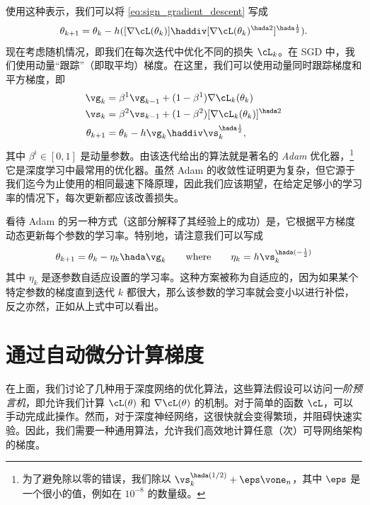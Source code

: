 \documentclass[../../book-main_zh.tex]{subfiles}
\begin{document}
使用这种表示，我们可以将 \eqref{eq:sign_gradient_descent} 写成
\begin{equation}
    \theta_{k + 1} = \theta_{k} - h ([\nabla \cL(\theta_{k})] \haddiv [\nabla
    \cL(\theta_{k})^{\hada 2}]^{\hada \frac{1}{2}}).
\end{equation}
现在考虑随机情况，即我们在每次迭代中优化不同的损失 \(\cL_{k}\)。在 SGD 中，我们使用动量“跟踪”（即取平均）梯度。在这里，我们可以使用动量同时跟踪梯度和平方梯度，即
\begin{align}
    \vg_{k}
    &= \beta^{1}\vg_{k - 1} + (1 - \beta^{1})\nabla \cL_{k}(\theta_{k}) \\
    \vs_{k}
    &= \beta^{2}\vs_{k - 1} + (1 - \beta^{2})[\nabla
    \cL_{k}(\theta_{k})]^{\hada 2}  \\
    \theta_{k + 1}
    &= \theta_{k} - h\vg_{k}\haddiv\vs_{k}^{\hada \frac{1}{2}},
\end{align}
其中 \(\beta^{i} \in [0, 1]\) 是动量参数。由该迭代给出的算法就是著名的 \textit{Adam} 优化器，\footnote{为了避免除以零的错误，我们除以 \(\vs_{k}^{\hada (1/2)} + \eps \vone_{n}\)，其中 \(\eps\) 是一个很小的值，例如在 \(10^{-8}\) 的数量级。}它是深度学习中最常用的优化器。虽然 Adam 的收敛性证明更为复杂，但它源于我们迄今为止使用的相同最速下降原理，因此我们应该期望，在给定足够小的学习率的情况下，每次更新都应该改善损失。

看待 Adam 的另一种方式（这部分解释了其经验上的成功）是，它根据平方梯度动态更新每个参数的学习率。特别地，请注意我们可以写成
\begin{equation}
    \theta_{k + 1} = \theta_{k} - \eta_{k} \hada \vg_{k} \qquad \text{where}
    \qquad \eta_{k} = h \vs_{k}^{\hada (-\frac{1}{2})}
\end{equation}
其中 \(\eta_{k}\) 是逐参数自适应设置的学习率。这种方案被称为自适应的，因为如果某个特定参数的梯度直到迭代 \(k\) 都很大，那么该参数的学习率就会变小以进行补偿，反之亦然，正如从上式中可以看出。

\section{通过自动微分计算梯度}\label{sec:autodiff}

在上面，我们讨论了几种用于深度网络的优化算法，这些算法假设可以访问\textit{一阶预言机}，即允许我们计算 \(\cL(\theta)\) 和 \(\nabla
\cL(\theta)\) 的机制。对于简单的函数 \(\cL\)，可以手动完成此操作。然而，对于深度神经网络，这很快就会变得繁琐，并阻碍快速实验。因此，我们需要一种通用算法，允许我们高效地计算任意（次）可导网络架构的梯度。
\end{document}
